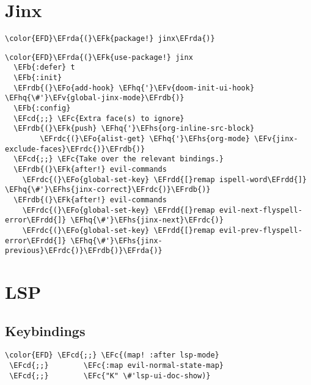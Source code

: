 \documentclass[12pt]{article}
\theoremstyle{plain}%
\theoremstyle{definition}
\theoremstyle{remark}
\newcommand{\EFc}[1]{\textcolor{EFc}{#1}} %
\newcommand{\EFcd}[1]{\textcolor{EFcd}{#1}} %
\newcommand{\EFk}[1]{\textcolor{EFk}{#1}} %
\newcommand{\EFb}[1]{\textcolor{EFb}{#1}} %
\newcommand{\EFv}[1]{\textcolor{EFv}{#1}} %
\newcommand{\EFo}[1]{\textcolor{EFo}{#1}} %
\newcommand{\EFhq}[1]{\textcolor{EFhq}{#1}} %
\newcommand{\EFhs}[1]{\textcolor{EFhs}{#1}} %
\newcommand{\EFrda}[1]{\textcolor{EFrda}{#1}} %
\newcommand{\EFrdb}[1]{\textcolor{EFrdb}{#1}} %
\newcommand{\EFrdc}[1]{\textcolor{EFrdc}{#1}} %
\newcommand{\EFrdd}[1]{\textcolor{EFrdd}{#1}} %
\begin{document}
\section{Jinx}
\label{sec:org028ccbf}
\begin{Code}
\begin{Verbatim}
\color{EFD}\EFrda{(}\EFk{package!} jinx\EFrda{)}
\end{Verbatim}
\end{Code}
\begin{Code}
\begin{Verbatim}
\color{EFD}\EFrda{(}\EFk{use-package!} jinx
  \EFb{:defer} t
  \EFb{:init}
  \EFrdb{(}\EFo{add-hook} \EFhq{'}\EFv{doom-init-ui-hook} \EFhq{\#'}\EFv{global-jinx-mode}\EFrdb{)}
  \EFb{:config}
  \EFcd{;;} \EFc{Extra face(s) to ignore}
  \EFrdb{(}\EFk{push} \EFhq{'}\EFhs{org-inline-src-block}
        \EFrdc{(}\EFo{alist-get} \EFhq{'}\EFhs{org-mode} \EFv{jinx-exclude-faces}\EFrdc{)}\EFrdb{)}
  \EFcd{;;} \EFc{Take over the relevant bindings.}
  \EFrdb{(}\EFk{after!} evil-commands
    \EFrdc{(}\EFo{global-set-key} \EFrdd{[}remap ispell-word\EFrdd{]} \EFhq{\#'}\EFhs{jinx-correct}\EFrdc{)}\EFrdb{)}
  \EFrdb{(}\EFk{after!} evil-commands
    \EFrdc{(}\EFo{global-set-key} \EFrdd{[}remap evil-next-flyspell-error\EFrdd{]} \EFhq{\#'}\EFhs{jinx-next}\EFrdc{)}
    \EFrdc{(}\EFo{global-set-key} \EFrdd{[}remap evil-prev-flyspell-error\EFrdd{]} \EFhq{\#'}\EFhs{jinx-previous}\EFrdc{)}\EFrdb{)}\EFrda{)}
\end{Verbatim}
\end{Code}
\section{LSP}
\label{sec:org5051d84}
\subsection{Keybindings}
\label{sec:org1d40caa}
\begin{Code}
\begin{Verbatim}
\color{EFD} \EFcd{;;} \EFc{(map! :after lsp-mode}
 \EFcd{;;}        \EFc{:map evil-normal-state-map}
 \EFcd{;;}        \EFc{"K" \#'lsp-ui-doc-show)}
\end{Verbatim}
\end{Code}
\end{document}
